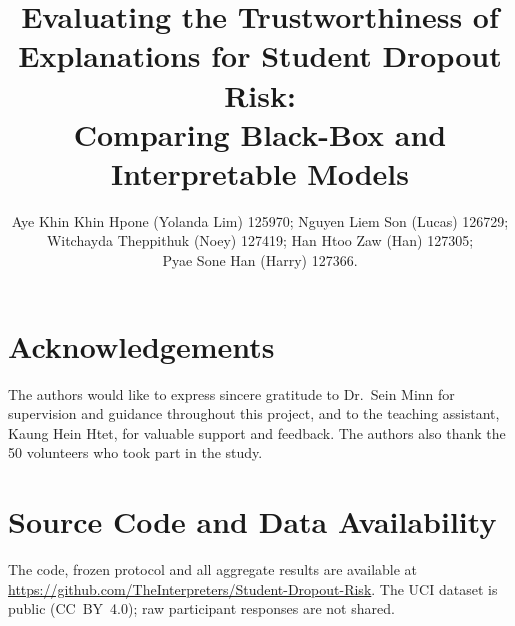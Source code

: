 \documentclass[10pt,twocolumn,letterpaper]{article}
\title{Evaluating the Trustworthiness of Explanations for Student Dropout Risk:\\
Comparing Black-Box and Interpretable Models}
\author{
Aye Khin Khin Hpone (Yolanda Lim) 125970; \quad Nguyen Liem Son (Lucas) 126729;\\
Witchayda Theppithuk (Noey) 127419; \quad Han Htoo Zaw (Han) 127305;\\
Pyae Sone Han (Harry) 127366.
}
\begin{document}
\maketitle










\section*{Acknowledgements}
The authors would like to express sincere gratitude to Dr.\ Sein Minn for supervision and guidance
throughout this project, and to the teaching assistant, Kaung Hein Htet, for valuable support and
feedback. The authors also thank the 50 volunteers who took part in the study.

\section*{Source Code and Data Availability}
The code, frozen protocol and all aggregate results are available at
\href{https://github.com/TheInterpreters/Student-Dropout-Risk}{https://github.com/TheInterpreters/Student-Dropout-Risk}.
The UCI dataset is public (CC~BY~4.0); raw participant responses are not shared.

{\small


}


\end{document}
